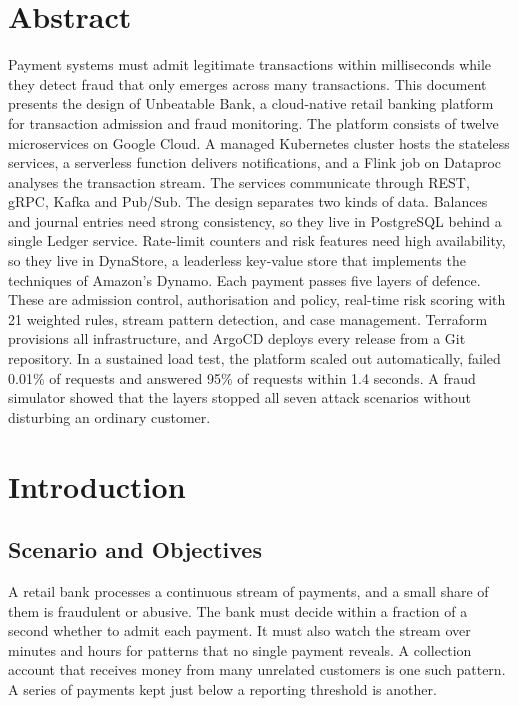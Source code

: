 \documentclass[11pt,a4paper]{article}
\newcommand{\project}{Unbeatable Bank}
\begin{document}
\section*{Abstract}
\vspace{0.3cm}
\noindent Payment systems must admit legitimate transactions within milliseconds while they detect fraud that only emerges across many transactions. This document presents the design of \project{}, a cloud-native retail banking platform for transaction admission and fraud monitoring. The platform consists of twelve microservices on Google Cloud. A managed Kubernetes cluster hosts the stateless services, a serverless function delivers notifications, and a Flink job on Dataproc analyses the transaction stream. The services communicate through REST, gRPC, Kafka and Pub/Sub. The design separates two kinds of data. Balances and journal entries need strong consistency, so they live in PostgreSQL behind a single Ledger service. Rate-limit counters and risk features need high availability, so they live in DynaStore, a leaderless key-value store that implements the techniques of Amazon's Dynamo. Each payment passes five layers of defence. These are admission control, authorisation and policy, real-time risk scoring with 21 weighted rules, stream pattern detection, and case management. Terraform provisions all infrastructure, and ArgoCD deploys every release from a Git repository. In a sustained load test, the platform scaled out automatically, failed 0.01\% of requests and answered 95\% of requests within 1.4 seconds. A fraud simulator showed that the layers stopped all seven attack scenarios without disturbing an ordinary customer.
\clearpage

\tableofcontents
\newpage

\section{Introduction}
\label{sec:introduction}

\subsection{Scenario and Objectives}
\label{sec:scenario}

A retail bank processes a continuous stream of payments, and a small share of them is fraudulent or abusive. The bank must decide within a fraction of a second whether to admit each payment. It must also watch the stream over minutes and hours for patterns that no single payment reveals. A collection account that receives money from many unrelated customers is one such pattern. A series of payments kept just below a reporting threshold is another.
\end{document}
